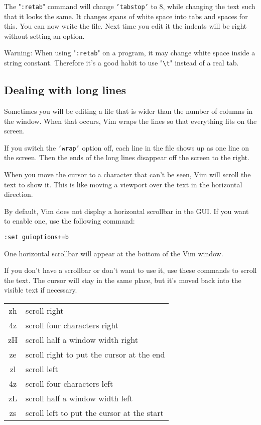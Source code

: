 The "\texttt{:retab}" command will change \texttt{'tabstop'} to 8, while changing the text such that it looks the same.
It changes spans of white space into tabs and spaces for this.
You can now write the file.
Next time you edit it the indents will be right without setting an option.

Warning: When using "\texttt{:retab}" on a program, it may change white space inside a string constant.
Therefore it's a good habit to use "\verb!\t!" instead of a real tab.
\subsection{Dealing with long lines}
Sometimes you will be editing a file that is wider than the number of columns in the window.
When that occurs, Vim wraps the lines so that everything fits on the screen.

If you switch the \texttt{'wrap'} option off, each line in the file shows up as one line on the screen.
Then the ends of the long lines disappear off the screen to the right.

When you move the cursor to a character that can't be seen, Vim will scroll the text to show it.
This is like moving a viewport over the text in the horizontal direction.

By default, Vim does not display a horizontal scrollbar in the GUI.
If you want to enable one, use the following command:

\begin{Verbatim}[samepage=true]
 :set guioptions+=b
\end{Verbatim}

One horizontal scrollbar will appear at the bottom of the Vim window.

If you don't have a scrollbar or don't want to use it, use these commands to scroll the text.
The cursor will stay in the same place, but it's moved back into the visible text if necessary.

\begin{center} \begin{tabular}{c l}
				zh & scroll right \\
				4z & scroll four characters right \\
				zH & scroll half a window width right \\
				ze & scroll right to put the cursor at the end \\
				zl & scroll left \\
				4z & scroll four characters left \\
				zL & scroll half a window width left \\
				zs & scroll left to put the cursor at the start \\
\end{tabular} \end{center}

